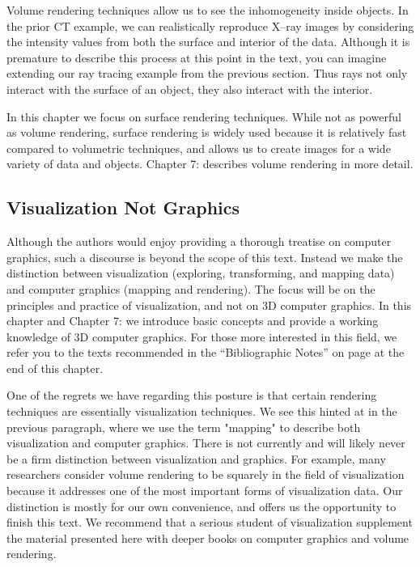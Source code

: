 Volume rendering techniques allow us to see the inhomogeneity inside objects. In the prior CT example, we can realistically reproduce X--ray images by considering the intensity values from both the surface and interior of the data. Although it is premature to describe this process at this point in the text, you can imagine extending our ray tracing example from the previous section. Thus rays not only interact with the surface of an object, they also interact with the interior.

In this chapter we focus on surface rendering techniques. While not as powerful as volume rendering, surface rendering is widely used because it is relatively fast compared to volumetric techniques, and allows us to create images for a wide variety of data and objects. Chapter 7:  describes volume rendering in more detail.

\subsection{Visualization Not Graphics}

Although the authors would enjoy providing a thorough treatise on computer graphics, such a discourse is beyond the scope of this text. Instead we make the distinction between visualization (exploring, transforming, and mapping data) and computer graphics (mapping and rendering). The focus will be on the principles and practice of visualization, and not on 3D computer graphics. In this chapter and Chapter 7:  we introduce basic concepts and provide a working knowledge of 3D computer graphics. For those more interested in this field, we refer you to the texts recommended in the ``Bibliographic Notes'' on page \pageref{Ch03BibNotes} at the end of this chapter.

One of the regrets we have regarding this posture is that certain rendering techniques are essentially visualization techniques. We see this hinted at in the previous paragraph, where we use the term "mapping" to describe both visualization and computer graphics. There is not currently and will likely never be a firm distinction between visualization and graphics. For example, many researchers consider volume rendering to be squarely in the field of visualization because it addresses one of the most important forms of visualization data. Our distinction is mostly for our own convenience, and offers us the opportunity to finish this text. We recommend that a serious student of visualization supplement the material presented here with deeper books on computer graphics and volume rendering.

